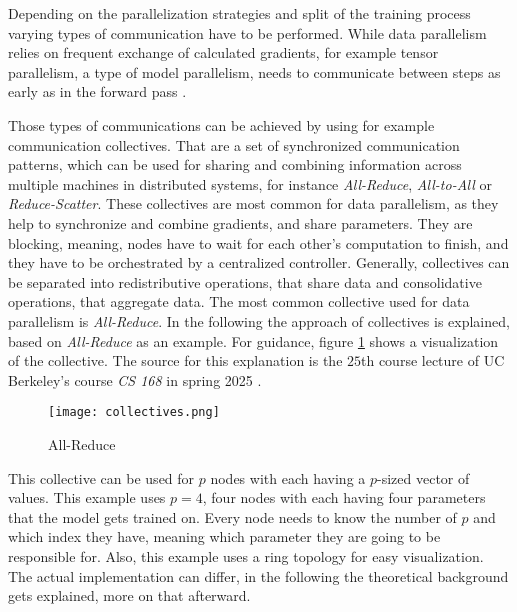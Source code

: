 Depending on the parallelization strategies and split of the training process varying types of communication have to be performed. 
While data parallelism relies on frequent exchange of calculated gradients, for example tensor parallelism, a type of model parallelism, needs to communicate between steps as early as in the forward pass \cite{dong_towards_2024}. %

Those types of communications can be achieved by using for example communication collectives. That are a set of synchronized communication patterns, which can be used for sharing and combining information across multiple machines in distributed systems, for instance \textit{All-Reduce}, \textit{All-to-All} or \textit{Reduce-Scatter}. 
These collectives are most common for data parallelism, as they help to synchronize and combine gradients, and share parameters. They are blocking, meaning, nodes have to wait for each other's computation to finish, and they have to be orchestrated by a centralized controller.
Generally, collectives can be separated into redistributive operations, that share data and consolidative operations, that aggregate data. 
The most common collective used for data parallelism is \textit{All-Reduce}. In the following the approach of collectives is explained, based on \textit{All-Reduce} as an example. For guidance, figure \ref{fig:collectives} shows a visualization of the collective.
The source for this explanation is the $25$th course lecture of UC Berkeley's course \textit{CS 168} in spring 2025 \cite{ratnasamy_collective_2025}.

\begin{figure}[H]  %
  \centering
  \texttt{[image: collectives.png]}
  \caption{All-Reduce}
  \label{fig:collectives}
\end{figure}

This collective can be used for $p$ nodes with each having a  $p$-sized vector of values. 
This example uses $p = 4$, four nodes with each having four parameters that the model gets trained on. 
Every node needs to know the number of $p$ and which index they have, meaning which parameter they are going to be responsible for. Also, this example uses a ring topology for easy visualization. The actual implementation can differ, in the following the theoretical background gets explained, more on that afterward.

